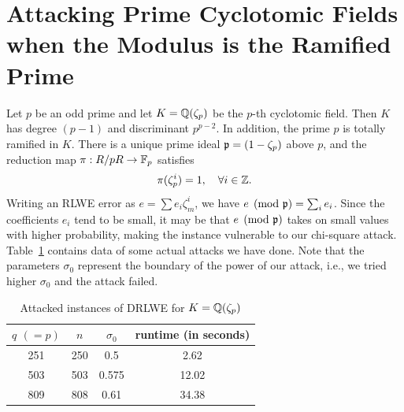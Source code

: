 \documentclass[envcountsame]{llncs}
\begin{document}
\section{Attacking Prime Cyclotomic Fields when the Modulus is the Ramified Prime}
\label{sec: ramified-prime}

Let $p$ be an odd prime and let $K = \mathbb{Q}(\zeta_p)$ be the $p$-th cyclotomic field. Then $K$ has degree $(p-1)$ and discriminant $p^{p-2}$. In addition, the prime $p$ is totally ramified in $K$. There is a unique prime ideal $\mathfrak{p} = (1 - \zeta_p)$ above $p$, and the reduction map  $\pi: R/pR \to \mathbb{F}_p$ satisfies
\[
        \pi(\zeta_p^i) = 1, \quad \forall i \in \mathbb{Z}.
\]
Writing an RLWE error as  $e = \sum e_i \zeta_m^i$, we have $e \pmod{\mathfrak{p}} = \sum_i e_i$. Since the coefficients $e_i$ tend to be small, it may be that  $e \pmod{\mathfrak{p}}$ takes on small values with higher probability, making the instance vulnerable to our chi-square attack. Table~\ref{tab: ramified} contains data of some actual attacks we have done. Note that the parameters $\sigma_0$ represent the boundary of the power of our attack, i.e., we tried higher $\sigma_0$ and the attack failed.

\begin{table}[H]
\begin{center}
\caption{Attacked instances of DRLWE for $K= \mathbb{Q}(\zeta_p)$}
\label{tab: ramified}
\begin{tabular}{c|c|c|c}
$q$ $( = p)$ & $n$ & $\sigma_0$ & runtime (in seconds) \\
\hline
251 & 250 &  0.5 & 2.62\\
503 &  503 & 0.575 & 12.02\\
809 & 808 & 0.61 & 34.38\\
\end{tabular}
\end{center}
\end{table}











\end{document}
